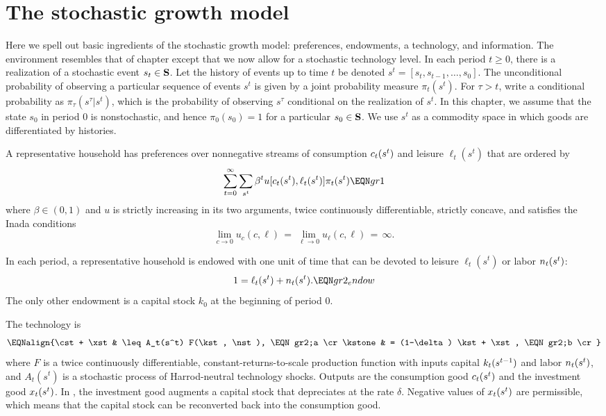 \section{The stochastic growth model}
Here we spell out basic ingredients of the stochastic growth model:
preferences, endowments, a technology, and information. The
environment resembles that of  chapter  except
that we now allow for a stochastic technology level.
In each period $t\geq 0$, there is a realization of a stochastic
event $s_t \in {\bf S}$. Let the history of events up to time $t$
be denoted $s^t = [s_t, s_{t-1}, \ldots, s_0]$. The unconditional
probability of observing a particular sequence of events $s^t$ is
given by a joint probability measure $\pi_t(s^t)$. For $\tau > t$, write a conditional
probability as $\pi_\tau(s^\tau\vert s^t)$, which is the probability
of observing $s^\tau$ conditional on the realization of $s^t$.
In this chapter, we assume that the state $s_0$ in period 0 is
nonstochastic, and hence $\pi_0(s_0)=1$ for a particular
$s_0\in{\bf S}$. We use $s^t$ as a commodity space in which
goods are differentiated by histories.


A representative household has preferences over nonnegative
streams of consumption ${c_t(s^t)}$ and leisure $\ell_t(s^t)$ that
are ordered by
$$ \sum_{t=0}^\infty \sum_{s^t} \beta^t u[\cst,\ell_t(s^t) ]\pist  \EQN gr1 $$
where $\beta \in (0,1)$ and $u$ is strictly increasing in its
two arguments, twice continuously differentiable, strictly concave,
and satisfies the Inada conditions
$$
\lim_{c\to 0} u_c(c,\ell)   \,=\,
\lim_{\ell\to 0} u_\ell(c,\ell)   \,=\, \infty.
$$

In each period, a representative household is endowed with one
unit of time that can be devoted to leisure $\ell_t(s^t)$
or labor ${n_t(s^t)}$:
$$             1     = \ell_t(s^t) +\nst.      \EQN gr2_endow $$
The only other endowment is a capital stock $k_0$ at the
beginning of period $0$.


The technology is
$$\EQNalign{\cst + \xst& \leq A_t(s^t) F(\kst, \nst), \EQN gr2;a \cr
            \kstone & = (1-\delta) \kst + \xst, \EQN gr2;b \cr}$$
where $F$ is a twice continuously differentiable,
constant-returns-to-scale production function  with inputs capital
${k_t(s^{t-1})}$ and labor ${n_t(s^t)}$, and $A_t(s^t)$ is a stochastic process of
Harrod-neutral technology shocks. Outputs are the consumption good
${c_t(s^t)}$ and the investment good ${x_t(s^t)}$.  In , the
investment good augments a capital stock that  depreciates at
the rate $\delta$. Negative values of ${x_t(s^t)}$ are permissible, which
means that the capital stock can be reconverted back into the
consumption good.




